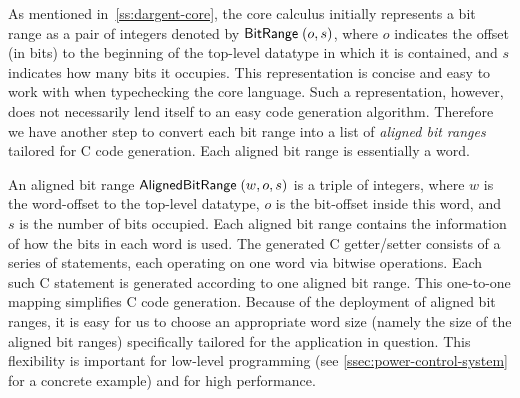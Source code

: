 As mentioned in~\autoref{ss:dargent-core}, the \dargent core calculus initially represents a bit range
as a pair of integers denoted by $\mathsf{BitRange}\;(o, s)$, where $o$ indicates the offset (in bits)
to the beginning of the top-level datatype in which it is contained, and $s$ indicates how many
bits it occupies. This representation is concise and easy to work with when typechecking the core language.
Such a representation, however, does not necessarily lend itself to an easy code
generation algorithm. Therefore we have another
step to convert each bit range into a list of \emph{aligned bit ranges} tailored for C code generation. Each aligned bit range is essentially a word.

An aligned bit range $\mathsf{AlignedBitRange}\;(w, o, s)$ is a triple of integers, where $w$ is the
word-offset to the top-level datatype, $o$ is the bit-offset inside this word,
and $s$ is the number of bits occupied.
Each aligned bit range contains the information of how the bits in each word is used.
The generated C getter/setter consists of a series of statements, each operating on one
word via bitwise operations.
Each such C statement is generated according to one aligned bit range. This one-to-one mapping simplifies
C code generation. Because of the deployment of aligned bit ranges,
it is easy for us to choose an appropriate word size (namely the size of the
aligned bit ranges) specifically tailored for the application in question.
This flexibility is important for low-level programming (see \autoref{ssec:power-control-system} for a concrete example) and for high performance.




